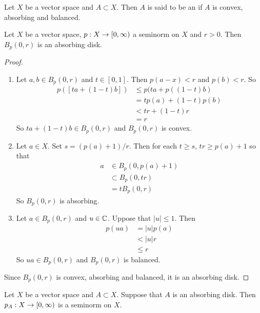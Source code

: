 \documentclass{book}
\begin{document}
		\begin{defn}
		Let $X$ be a vector space and $A \subset X$. Then $A$ is said to be an  if $A$ is convex, absorbing and balanced.
	\end{defn}
	
	\begin{ex}
		Let $X$ be a vector space, $p :X \rightarrow [0,\infty)$ a seminorm on $X$ and $r >0$. Then $B_p(0, r)$ is an absorbing disk.
	\end{ex}
	
	\begin{proof}\
		\begin{enumerate}
			\item Let $a, b \in B_p(0, r)$ and $t \in [0,1]$. Then $p(a - x) < r$ and $p(b) < r$. So 
			\begin{align*}
				p([ta + (1 - t)b]) 
				&\leq p(ta + p((1-t)b) \\
				&= tp(a) + (1-t)p(b) \\
				&< tr + (1-t)r \\
				&= r
			\end{align*}
			So $ta + (1 - t)b \in B_p(0, r)$ and $B_p(0, r)$ is convex.
			\item Let $a \in X$. Set $s = (p(a) + 1)/ r$. Then for each $t \geq s$, $tr \geq p(a)+1$ so that 
			\begin{align*}
				a 
				& \in B_p(0, p(a)+ 1) \\
				& \subset B_p(0, tr) \\
				& = tB_p(0, r) 
			\end{align*} 
			So $B_p(0,r)$ is absorbing.
			\item Let $a \in B_p(0, r)$ and $u \in \mathbb{C}$. Uppose that $|u| \leq 1$. Then
			\begin{align*}
				p(ua)
				&= |u|p(a) \\
				&< |u|r \\
				&\leq r
			\end{align*}
			So $ua \in B_p(0, r)$ and $B_p(0, r)$ is balanced. 
		\end{enumerate}
		Since $B_p(0, r)$ is convex, absorbing and balanced, it is an absorbing disk. 
	\end{proof}
	
	
	\begin{ex}
		Let $X$ be a vector space and $A \subset X$. Suppose that $A$ is an absorbing disk. Then $p_A:X \rightarrow [0,\infty)$ is a seminorm on $X$.
	\end{ex}
	
\end{document}
